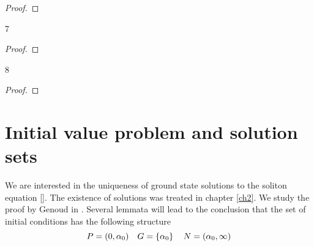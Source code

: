 \begin{proof}
% 
\end{proof}

\begin{lemma}\label{genlem7}
7
\end{lemma}
\begin{proof}
\end{proof}

\begin{lemma}\label{genlem8}
8
\end{lemma}
\begin{proof}
\end{proof}

\section{Initial value problem and solution sets}
We are interested in the uniqueness of ground state solutions to the soliton
equation \eqref{}. The existence of solutions was treated in chapter \ref{ch2}.
We study the proof by Genoud in \cite{gen11}. Several lemmata will lead to the
conclusion that the set of initial conditions has the following structure
\[ P=(0,\alpha_0)\quad G=\left\{\alpha_0\right\}\quad N=(\alpha_0,\infty) \]


